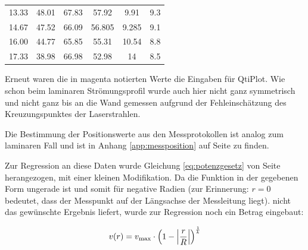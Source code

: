 \begin{table}[h!t]
\begin{tabular}{>{\color{magenta}}S>{\color{lightgray}}S>{\color{lightgray}}S>{\color{lightgray}}S>{\color{lightgray}}S>{\color{magenta}}S}
        13.33
        & 48.01
        & 67.83
        & 57.92
        & 9.91
        & 9.3 
        \\

        14.67
        & 47.52
        & 66.09
        & 56.805
        & 9.285
        & 9.1 
        \\

        16.00
        & 44.77
        & 65.85
        & 55.31
        & 10.54
        & 8.8 
        \\

        17.33
        & 38.98
        & 66.98
        & 52.98
        & 14
        & 8.5 
        \\

        \bottomrule
    \end{tabular}
\end{table}

Erneut waren  die in magenta  notierten Werte die Eingaben  f\"ur QtiPlot. Wie
schon beim laminaren Str\"omungsprofil wurde  auch hier nicht ganz symmetrisch
und nicht  ganz bis an die  Wand gemessen aufgrund der  Fehleinsch\"atzung des
Kreuzungspunktes der Laserstrahlen.

Die  Bestimmung   der  Positionswerte  aus  den   Messprotokollen  ist  analog
zum  laminaren  Fall  und  ist  in  Anhang  \ref{app:messposition}  auf  Seite
\pageref{app:messposition} zu finden.

Zur Regression an diese Daten  wurde Gleichung \ref{eq:potenzgesetz} von Seite
\pageref{eq:potenzgesetz} herangezogen, mit einer kleinen Modifikation. Da die
Funktion in  der gegebenen Form ungerade  ist und somit f\"ur  negative Radien
(zur Erinnerung: $r = 0$ bedeutet, dass der Messpunkt auf der L\"angsachse der
Messleitung  liegt).  nicht  das  gew\"unschte  Ergebnis  liefert,  wurde  zur
Regression noch ein Betrag eingebaut:

\begin{equation}
    \label{eq:potenzgesetz:abs}
    v(r) = v_{\mathrm{max}} \cdot \left( 1 - \abs*{\frac{r}{R}} \right)^{\frac{1}{k}}
\end{equation}

